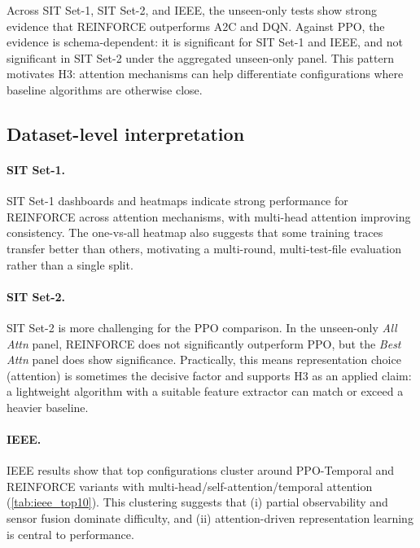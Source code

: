 \documentclass[11pt]{article}
\newcommand{\autorlTableRoot}{tables}
\renewcommand{\autorlTableRoot}{paper/tables}%
\begin{document}
\begin{table}[t]
	\centering
	\caption{Hypothesis tests for H1 (unseen-only evaluation score): one-tailed Welch $t$-tests comparing REINFORCE to each competitor at $\alpha=0.05$.}
	\label{tab:hyp_tests}
	
\end{table}

Across SIT Set-1, SIT Set-2, and IEEE, the unseen-only tests show strong evidence that REINFORCE outperforms A2C and DQN. Against PPO, the evidence is schema-dependent: it is significant for SIT Set-1 and IEEE, and not significant in SIT Set-2 under the aggregated unseen-only panel. This pattern motivates H3: attention mechanisms can help differentiate configurations where baseline algorithms are otherwise close.

\subsection{Dataset-level interpretation}
\label{sec:dataset_interpretation}
\paragraph{SIT Set-1.}
SIT Set-1 dashboards and heatmaps indicate strong performance for REINFORCE across attention mechanisms, with multi-head attention improving consistency. The one-vs-all heatmap also suggests that some training traces transfer better than others, motivating a multi-round, multi-test-file evaluation rather than a single split.

\paragraph{SIT Set-2.}
SIT Set-2 is more challenging for the PPO comparison. In the unseen-only \emph{All Attn} panel, REINFORCE does not significantly outperform PPO, but the \emph{Best Attn} panel does show significance. Practically, this means representation choice (attention) is sometimes the decisive factor and supports H3 as an applied claim: a lightweight algorithm with a suitable feature extractor can match or exceed a heavier baseline.

\paragraph{IEEE.}
IEEE results show that top configurations cluster around PPO-Temporal and REINFORCE variants with multi-head/self-attention/temporal attention (\cref{tab:ieee_top10}). This clustering suggests that (i) partial observability and sensor fusion dominate difficulty, and (ii) attention-driven representation learning is central to performance.
\end{document}
